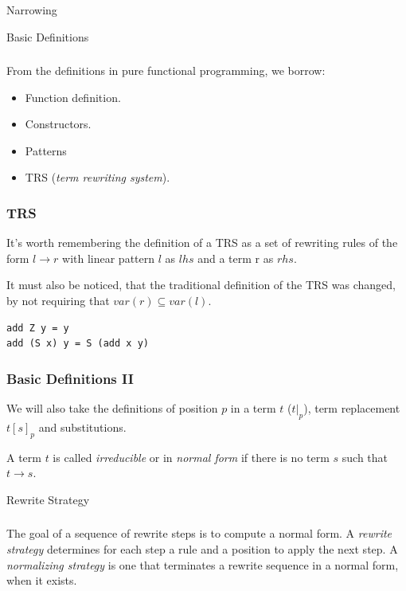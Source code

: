 \documentclass{beamer}
\begin{document}
\begin{section}{Narrowing}
  \begin{subsection}{Basic Definitions}
\begin{frame}
\frametitle{\subsecname}
  From the definitions in pure functional programming, we borrow:
  \begin{itemize}
    \item Function definition.
    \item Constructors.
    \item Patterns
    \item TRS (\textit{term rewriting system}).
  \end{itemize}


\end{frame}

\begin{frame}
[fragile]
\frametitle{TRS}
 It's worth remembering the definition of a TRS as a set of rewriting rules of the form $l \rightarrow r$ with linear pattern $l$ as $lhs$ and a term r as $rhs$.

  It must also be noticed, that the traditional definition of the TRS was changed, by not requiring that $var(r) \subseteq var(l)$.

\begin{example}
\begin{verbatim}
add Z y = y
add (S x) y = S (add x y)
\end{verbatim}
\end{example}

\end{frame}

\begin{frame}
[fragile]

\frametitle{Basic Definitions II}
  We will also take the definitions of position $p$ in a term $t$ ($t|_p$), term replacement $t[s]_p$ and substitutions.

\bigskip
  A term $t$ is called \textit{irreducible} or in \textit{normal form} if there is no term $s$ such that $t \rightarrow s$.
\end{frame}
\end{subsection}

\begin{subsection}{Rewrite Strategy}

  \begin{frame}
\frametitle{\subsecname}
  The goal of a sequence of rewrite steps is to compute a normal form. A \textit{rewrite strategy} determines for each step a rule and a position to apply the next step. A \textit{normalizing strategy} is one that terminates a rewrite sequence in a normal form, when it exists.
\end{frame}


\end{subsection}
\end{section}
\end{document}

